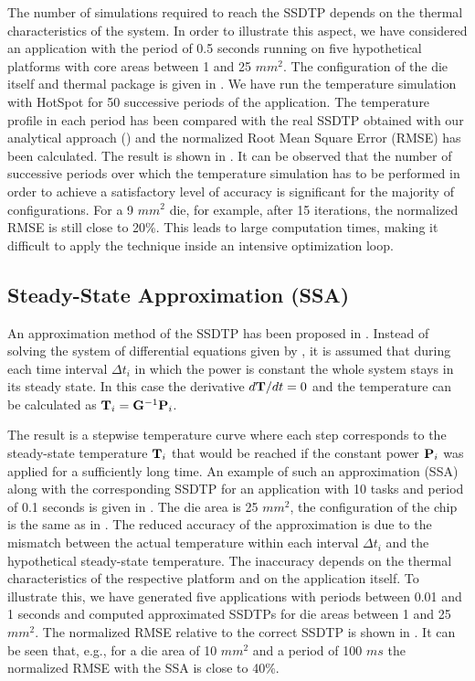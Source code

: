 The number of simulations required to reach the SSDTP depends on the thermal characteristics of the system. In order to illustrate this aspect, we have considered an application with the period of 0.5 seconds running on five hypothetical platforms with core areas between 1 and 25 $mm^2$. The configuration of the die itself and thermal package is given in . We have run the temperature simulation with HotSpot \cite{huang2003} for 50 successive periods of the application. The temperature profile in each period has been compared with the real SSDTP obtained with our analytical approach () and the normalized Root Mean Square Error (RMSE) has been calculated. The result is shown in . It can be observed that the number of successive periods over which the temperature simulation has to be performed in order to achieve a satisfactory level of accuracy is significant for the majority of configurations. For a 9 $mm^2$ die, for example, after 15 iterations, the normalized RMSE is still close to 20\%. This leads to large computation times, making it difficult to apply the technique inside an intensive optimization loop.

\subsection{Steady-State Approximation (SSA)} \label{sec:steady-state-approximation}
An approximation method of the SSDTP has been proposed in \cite{huang2009}. Instead of solving the system of differential equations given by , it is assumed that during each time interval $\Delta t_i$ in which the power is constant the whole system stays in its steady state. In this case the derivative \mbox{$d\mathbf{T}/dt = 0$} and the temperature can be calculated as $\mathbf{T}_i = \mathbf{G}^{-1} \mathbf{P}_i$.

The result is a stepwise temperature curve where each step corresponds to the steady-state temperature $\mathbf{T}_i$ that would be reached if the constant power $\mathbf{P}_i$ was applied for a sufficiently long time. An example of such an approximation (SSA) along with the corresponding SSDTP for an application with 10 tasks and period of 0.1 seconds is given in . The die area is 25 $mm^2$, the configuration of the chip is the same as in . The reduced accuracy of the approximation is due to the mismatch between the actual temperature within each interval $\Delta t_i$ and the hypothetical steady-state temperature. The inaccuracy depends on the thermal characteristics of the respective platform and on the application itself. To illustrate this, we have generated five applications with periods between 0.01 and 1 seconds and computed approximated SSDTPs for die areas between 1 and 25 $mm^2$. The normalized RMSE relative to the correct SSDTP is shown in . It can be seen that, e.g., for a die area of 10 $mm^2$ and a period of 100 $ms$ the normalized RMSE with the SSA is close to 40\%.
